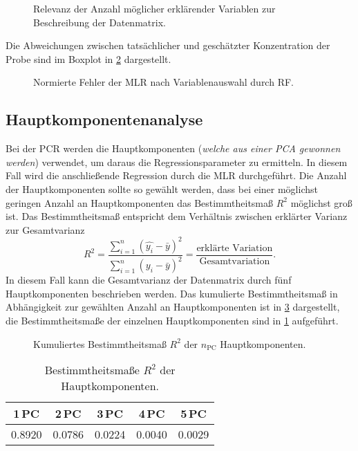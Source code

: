 \begin{figure} [htb]
  \centering
  
  \caption{Relevanz der Anzahl möglicher erklärender Variablen zur Beschreibung der Datenmatrix.}
  \label{fig:feature_importance}
\end{figure}

Die Abweichungen zwischen tatsächlicher und geschätzter Konzentration der Probe sind im Boxplot in \cref{fig:RFerror} dargestellt.
\begin{figure} [htb]
  \centering
  
  \caption{Normierte Fehler der MLR nach Variablenauswahl durch RF.}
  \label{fig:RFerror}
\end{figure}

\subsection{Hauptkomponentenanalyse}
Bei der \gls{PCR} werden die Hauptkomponenten (\emph{welche aus einer \gls{PCA} gewonnen werden}) verwendet, um daraus die Regressionsparameter zu ermitteln.
In diesem Fall wird die anschließende Regression durch die \gls{MLR} durchgeführt.
Die Anzahl der Hauptkomponenten sollte so gewählt werden, dass bei einer möglichst geringen Anzahl an Hauptkomponenten das Bestimmtheitsmaß $R^2$ möglichst groß ist.
Das Bestimmtheitsmaß entspricht dem Verhältnis zwischen erklärter Varianz zur Gesamtvarianz
\begin{equation}
  R^2 = \frac{\sum_{i = 1}^n (\hat{y_i} - \bar{y})^2}{\sum_{i=1}^n (y_i - \bar{y})^2} = \frac{\text{erklärte Variation}}{\text{Gesamtvariation}}.
\end{equation}
In diesem Fall kann die Gesamtvarianz der Datenmatrix durch fünf Hauptkomponenten beschrieben werden.
Das kumulierte Bestimmtheitsmaß in Abhängigkeit zur gewählten Anzahl an Hauptkomponenten ist in \cref{fig:variance} dargestellt, die Bestimmtheitsmaße der einzelnen Hauptkomponenten sind in \cref{tab:Bestimmtheit} aufgeführt.
\begin{figure} [htb]
  \centering
  
  \caption{Kumuliertes Bestimmtheitsmaß $R^2$ der $n_\mathrm{PC}$ Hauptkomponenten.}
  \label{fig:variance}
\end{figure}
\begin{table} [htb]
  \centering
  \caption{Bestimmtheitsmaße $R^2$ der Hauptkomponenten.}
  \label{tab:Bestimmtheit}
  \begin{tabular}{*5{c}}
    \toprule
    1\,PC & 2\,PC & 3\,PC & 4\,PC & 5\,PC \\
    \midrule
    \num[round-precision=4]{0.8920} & \num[round-precision=3]{0.0786} & \num[round-precision=3]{0.0224} & \num{0.0040} & \num{0.0029} \\
    \bottomrule
  \end{tabular}
\end{table}

